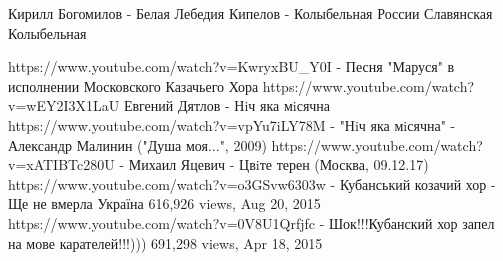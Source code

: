  
 

Кирилл Богомилов - Белая Лебедия
Кипелов - Колыбельная России
Славянская Колыбельная

https://www.youtube.com/watch?v=KwryxBU_Y0I - Песня "Маруся" в исполнении Московского Казачьего Хора
https://www.youtube.com/watch?v=wEY2I3X1LaU Евгений Дятлов - Нiч яка мiсячна
https://www.youtube.com/watch?v=vpYu7iLY78M - "Нiч яка мiсячна" - Александр Малинин ("Душа моя...", 2009)
https://www.youtube.com/watch?v=xATIBTc280U - Михаил Яцевич - Цвiте терен (Москва, 09.12.17)
https://www.youtube.com/watch?v=o3GSvw6303w - Кубанський козачий хор - Ще не вмерла Україна
616,926 views, Aug 20, 2015
https://www.youtube.com/watch?v=0V8U1Qrfjfc - Шок!!!Кубанский хор запел на мове карателей!!!)))
691,298 views, Apr 18, 2015
